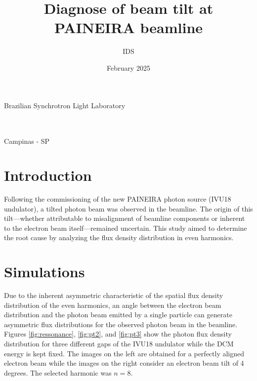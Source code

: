 \documentclass[a4paper,12pt]{article}
\title{Diagnose of beam tilt at PAINEIRA beamline}
\author{IDS}
\date{February 2025}
\begin{document}
\makeatletter
\begin{titlepage}
\begin{center}
    {\large Brazilian Synchrotron Light Laboratory}\\
    \vspace{7cm}
    {\Large\uppercase{\@author}\\
    \vspace{2cm}
    {\uppercase{\textbf{\@title}}}}\\
\end{center}
\vspace{2cm}
\begin{flushright}

\end{flushright}
\vspace{4cm}
\begin{center}
    {\large
    Campinas - SP\\
   \@date}
\end{center}
\end{titlepage}
\makeatother

\newpage
\tableofcontents 
\newpage
\section{Introduction} 
\par Following the commissioning of the new PAINEIRA
 photon source (IVU18 undulator), a tilted photon
  beam was observed in the beamline. The origin of this
   tilt—whether attributable to misalignment of beamline
    components or inherent to the electron beam itself—remained
     uncertain. This study aimed to determine the root cause by
      analyzing the flux density distribution in even harmonics.



\section{Simulations}
\par Due to the inherent asymmetric characteristic
 of the spatial flux density distribution of the even harmonics,
  an angle between the electron beam distribution and the photon beam emitted by
   a single particle can generate
    asymmetric flux distributions for the observed
     photon beam in the beamline.
      Figures \ref{fig:ressonance}, \ref{fig:pt2}, and \ref{fig:pt3} show the photon flux density
       distribution for three different gaps of the IVU18
        undulator while the DCM energy is kept fixed.
         The images on the left are obtained for a perfectly
          aligned electron beam while the images on
           the right consider an electron beam tilt of 4 degrees. The selected harmonic was $n=8$.
\end{document}
